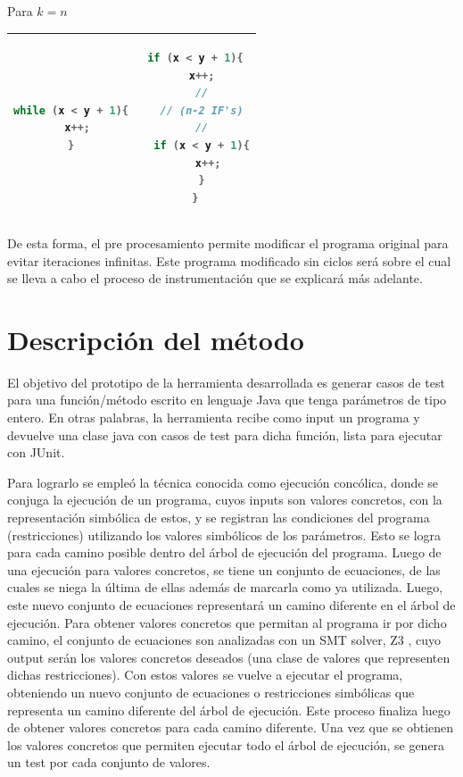 \documentclass{llncs}
\begin{document}
Para \(k = n\)
\begin{table}
\centering
\begin{tabular}{|c | c|}
\hline
\begin{lstlisting}[language=Java]
while (x < y + 1){
  x++;
}
\end{lstlisting} & 
\begin{lstlisting}[language=Java]
if (x < y + 1){
  x++;
  //
  // (n-2 IF's)
  //
  if (x < y + 1){
    x++;
  }
}
\end{lstlisting}\\
\hline
\end{tabular}
\end{table}

De esta forma, el pre procesamiento permite modificar el programa original para evitar iteraciones infinitas.
Este programa modificado sin ciclos será sobre el cual se lleva a cabo el proceso de instrumentación que se explicará más adelante.


\section{Descripción del método}
El objetivo del prototipo de la herramienta desarrollada es generar casos de test para una función/método escrito en lenguaje Java que tenga parámetros de tipo
entero. En otras palabras, la herramienta recibe como input un programa y devuelve una clase java con casos de test para dicha función, lista para ejecutar con JUnit.

Para lograrlo se empleó la técnica conocida como ejecución concólica, donde se conjuga la ejecución de un programa, cuyos inputs son valores concretos,
con la representación simbólica de estos, y se registran las condiciones del programa (restricciones) utilizando los valores simbólicos de los parámetros.
Esto se logra para cada camino posible dentro del árbol de ejecución del programa. Luego de una ejecución para valores concretos, se tiene un conjunto de
ecuaciones, de las cuales se niega la última de ellas además de marcarla como ya utilizada. Luego, este nuevo conjunto de ecuaciones representará un camino
diferente en el árbol de ejecución. Para obtener valores concretos que permitan al programa ir por dicho camino, el conjunto de ecuaciones son analizadas
con un SMT solver, Z3 \cite{z3solver}, cuyo output serán los valores concretos deseados (una clase de valores que representen dichas restricciones). Con estos valores se
vuelve a ejecutar el programa, obteniendo un nuevo conjunto de ecuaciones o restricciones simbólicas que representa un camino diferente del árbol de ejecución.
Este proceso finaliza luego de obtener valores concretos para cada camino diferente. Una vez que se obtienen los valores concretos que permiten ejecutar todo el
árbol de ejecución, se genera un test por cada conjunto de valores.
\end{document}
